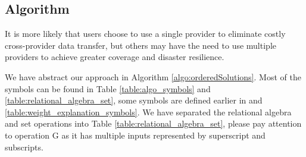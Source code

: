 \subsection{Algorithm}
It is more likely that users choose to use a single provider to eliminate costly cross-provider data transfer, but others may have the need to use multiple providers to achieve greater coverage and disaster resilience.

We have abstract our approach in Algorithm \ref{algo:orderedSolutions}. Most of the symbols can be found in Table \ref{table:algo_symbols} and \ref{table:relational_algebra_set}, some symbols are defined earlier in  and \ref{table:weight_explanation_symbols}. We have separated the relational algebra and set operations into Table \ref{table:relational_algebra_set}, please pay attention to operation G as it has multiple inputs represented by superscript and subscripts.

